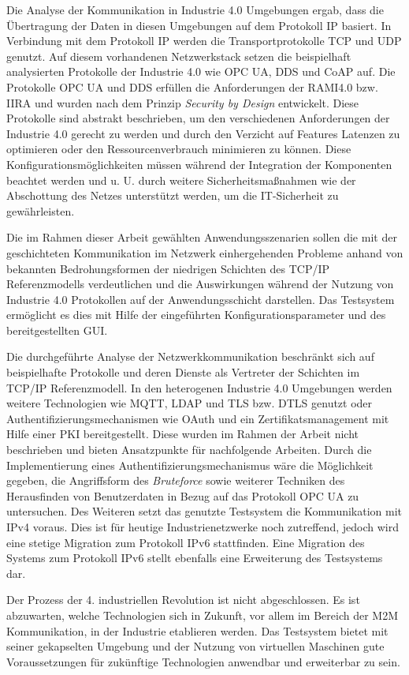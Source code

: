Die Analyse der Kommunikation in Industrie 4.0 Umgebungen ergab, dass die Übertragung der Daten in diesen Umgebungen auf dem Protokoll \ac{IP} basiert. In Verbindung mit dem Protokoll \ac{IP} werden die Transportprotokolle \ac{TCP} und \ac{UDP} genutzt. Auf diesem vorhandenen Netzwerkstack setzen die beispielhaft analysierten Protokolle der Industrie 4.0 wie \ac{OPC UA}, \ac{DDS} und \ac{CoAP} auf. Die Protokolle \ac{OPC UA} und \ac{DDS} erfüllen die Anforderungen der \ac{RAMI4.0} bzw. \ac{IIRA} und wurden nach dem Prinzip \textit{Security by Design} entwickelt. Diese Protokolle sind abstrakt beschrieben, um den verschiedenen Anforderungen der Industrie 4.0 gerecht zu werden und durch den Verzicht auf Features Latenzen zu optimieren oder den Ressourcenverbrauch minimieren zu können. Diese Konfigurationsmöglichkeiten müssen während der Integration der Komponenten beachtet werden und u. U. durch weitere Sicherheitsmaßnahmen wie der Abschottung des Netzes unterstützt werden, um die \ac{IT}-Sicherheit zu gewährleisten.

Die im Rahmen dieser Arbeit gewählten Anwendungsszenarien sollen die mit der geschichteten Kommunikation im Netzwerk einhergehenden Probleme anhand von bekannten Bedrohungsformen der niedrigen Schichten des \ac{TCP}/\ac{IP} Referenzmodells verdeutlichen und die Auswirkungen während der Nutzung von Industrie 4.0 Protokollen auf der Anwendungsschicht darstellen. Das Testsystem ermöglicht es dies mit Hilfe der eingeführten Konfigurationsparameter und des bereitgestellten \ac{GUI}.

Die durchgeführte Analyse der Netzwerkkommunikation beschränkt sich auf beispielhafte Protokolle und deren Dienste als Vertreter der Schichten im \ac{TCP}/\ac{IP} Referenzmodell. In den heterogenen Industrie 4.0 Umgebungen werden weitere Technologien wie \ac{MQTT}, \ac{LDAP} und \ac{TLS} bzw. \ac{DTLS} genutzt oder Authentifizierungsmechanismen wie \ac{OAuth} und ein Zertifikatsmanagement mit Hilfe einer \ac{PKI} bereitgestellt. Diese wurden im Rahmen der Arbeit nicht beschrieben und bieten Ansatzpunkte für nachfolgende Arbeiten. Durch die Implementierung eines Authentifizierungsmechanismus wäre die Möglichkeit gegeben, die Angriffsform des \textit{Bruteforce} sowie weiterer Techniken des Herausfinden von Benutzerdaten in Bezug auf das Protokoll \ac{OPC UA} zu untersuchen. Des Weiteren setzt das genutzte Testsystem die Kommunikation mit \ac{IP}v4 voraus. Dies ist für heutige Industrienetzwerke noch zutreffend, jedoch wird eine stetige Migration zum Protokoll \ac{IP}v6 stattfinden. Eine Migration des Systems zum Protokoll \ac{IP}v6 stellt ebenfalls eine Erweiterung des Testsystems dar.

Der Prozess der 4. industriellen Revolution ist nicht abgeschlossen. Es ist abzuwarten, welche Technologien sich in Zukunft, vor allem im Bereich der \ac{M2M} Kommunikation, in der Industrie etablieren werden. Das Testsystem bietet mit seiner gekapselten Umgebung und der Nutzung von virtuellen Maschinen gute Voraussetzungen für zukünftige Technologien anwendbar und erweiterbar zu sein.
